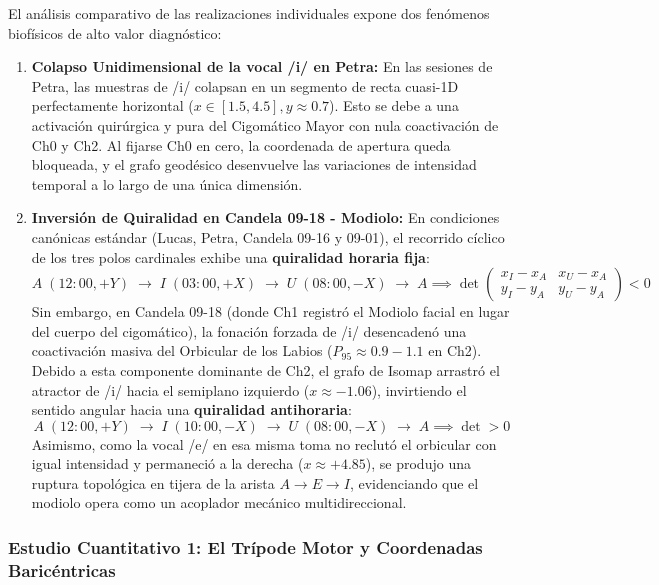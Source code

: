 \documentclass[11pt,a4paper]{article}
\begin{document}
El análisis comparativo de las realizaciones individuales expone dos fenómenos biofísicos de alto valor diagnóstico:
\begin{enumerate}
    \item \textbf{Colapso Unidimensional de la vocal /i/ en Petra:} En las sesiones de Petra, las muestras de /i/ colapsan en un segmento de recta cuasi-1D perfectamente horizontal ($x \in [1.5, 4.5], y \approx 0.7$). Esto se debe a una activación quirúrgica y pura del Cigomático Mayor con nula coactivación de Ch0 y Ch2. Al fijarse Ch0 en cero, la coordenada de apertura queda bloqueada, y el grafo geodésico desenvuelve las variaciones de intensidad temporal a lo largo de una única dimensión.
    \item \textbf{Inversión de Quiralidad en Candela 09-18 - Modiolo:} En condiciones canónicas estándar (Lucas, Petra, Candela 09-16 y 09-01), el recorrido cíclico de los tres polos cardinales exhibe una \textbf{quiralidad horaria fija}:
    \begin{equation}
        A \; (12:00, +Y) \;\longrightarrow\; I \; (03:00, +X) \;\longrightarrow\; U \; (08:00, -X) \;\longrightarrow\; A \implies \det \begin{pmatrix} x_I - x_A & x_U - x_A \\ y_I - y_A & y_U - y_A \end{pmatrix} < 0
    \end{equation}
    Sin embargo, en Candela 09-18 (donde Ch1 registró el Modiolo facial en lugar del cuerpo del cigomático), la fonación forzada de /i/ desencadenó una coactivación masiva del Orbicular de los Labios ($P_{95} \approx 0.9 - 1.1$ en Ch2). Debido a esta componente dominante de Ch2, el grafo de Isomap arrastró el atractor de /i/ hacia el semiplano izquierdo ($x \approx -1.06$), invirtiendo el sentido angular hacia una \textbf{quiralidad antihoraria}:
    \begin{equation}
        A \; (12:00, +Y) \;\longrightarrow\; I \; (10:00, -X) \;\longrightarrow\; U \; (08:00, -X) \;\longrightarrow\; A \implies \det > 0
    \end{equation}
    Asimismo, como la vocal /e/ en esa misma toma no reclutó el orbicular con igual intensidad y permaneció a la derecha ($x \approx +4.85$), se produjo una ruptura topológica en tijera de la arista $A \to E \to I$, evidenciando que el modiolo opera como un acoplador mecánico multidireccional.
\end{enumerate}

\subsubsection{Estudio Cuantitativo 1: El Trípode Motor y Coordenadas Baricéntricas}
\label{subsubsec:estudio_tripode_motor}
\end{document}
